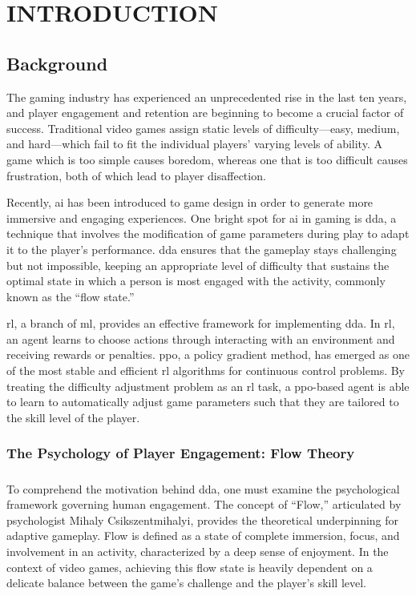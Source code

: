 \chapter{\MakeUppercase{Introduction}}
\justifying
\section{Background}
The gaming industry has experienced an unprecedented rise in the last ten years, and player engagement and retention are beginning to become a crucial factor of success. Traditional video games assign static levels of difficulty---easy, medium, and hard---which fail to fit the individual players' varying levels of ability. A game which is too simple causes boredom, whereas one that is too difficult causes frustration, both of which lead to player disaffection.

Recently, \ac{ai} has been introduced to game design in order to generate more immersive and engaging experiences. One bright spot for \ac{ai} in gaming is \ac{dda}, a technique that involves the modification of game parameters during play to adapt it to the player's performance. \ac{dda} ensures that the gameplay stays challenging but not impossible, keeping an appropriate level of difficulty that sustains the optimal state in which a person is most engaged with the activity, commonly known as the ``flow state.''

\ac{rl}, a branch of \ac{ml}, provides an effective framework for implementing \ac{dda}. In \ac{rl}, an agent learns to choose actions through interacting with an environment and receiving rewards or penalties. \ac{ppo}, a policy gradient method, has emerged as one of the most stable and efficient \ac{rl} algorithms for continuous control problems. By treating the difficulty adjustment problem as an \ac{rl} task, a \ac{ppo}-based agent is able to learn to automatically adjust game parameters such that they are tailored to the skill level of the player.

	
\subsection{The Psychology of Player Engagement: Flow Theory}
\paragraph{} To comprehend the motivation behind \ac{dda}, one must examine the psychological framework governing human engagement. The concept of ``Flow,'' articulated by psychologist Mihaly Csikszentmihalyi, provides the theoretical underpinning for adaptive gameplay. Flow is defined as a state of complete immersion, focus, and involvement in an activity, characterized by a deep sense of enjoyment. In the context of video games, achieving this flow state is heavily dependent on a delicate balance between the game's challenge and the player's skill level.
